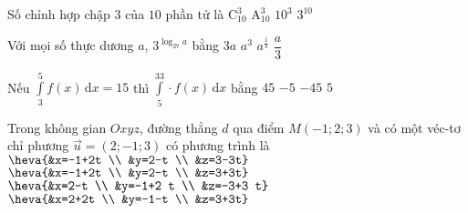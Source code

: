 \begin{ex}%
	Số chỉnh hợp chập $3$ của $10$ phần tử là
	\choice
	{$\mathrm{C}_{10}^3$}
	{\True $\mathrm{A}_{10}^3$}
	{$10^3$}
	{$3^{10}$}
\end{ex}

\begin{ex}%
	Với mọi số thực dương $a$, $3^{\log _{27}a}$ bằng
	\choice
	{$3a$}
	{\True $a^3$}
	{$a^{\tfrac{1}{3}}$}
	{$\dfrac{a}{3}$}
\end{ex}

\begin{ex}%
	Nếu $\displaystyle\int\limits_3^5f(x) \mathrm{\,d} x=15$ thì $\displaystyle\int\limits_5^33 \cdot f(x) \mathrm{\,d} x$ bằng
	\choice
	{$45$}
	{$-5$}
	{\True $-45$}
	{$5$}
\end{ex}

\begin{ex}%
	Trong không gian $Oxyz$, đường thẳng $d$ qua điểm $M(-1;2;3)$ và có một véc-tơ chỉ phương $\overrightarrow{u}=(2;-1;3)$ có phương trình là
	\choice
	{$\heva{&x=-1+2t \\ &y=2-t \\ &z=3-3t}$}
	{\True $\heva{&x=-1+2t \\ &y=2-t \\ &z=3+3t}$}
	{$\heva{&x=2-t \\ &y=-1+2 t \\ &z=-3+3 t}$}
	{$\heva{&x=2+2t \\ &y=-1-t \\ &z=3+3t}$}
\end{ex}


